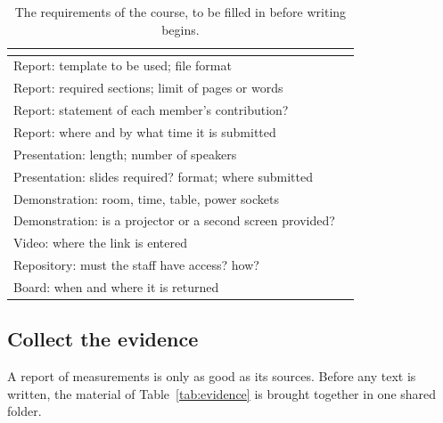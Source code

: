 \begin{table}[H]
\centering
\begin{tabular}{L{6.0cm}L{5.2cm}}
\toprule
{} &  \\
\midrule
Report: template to be used; file format & \\
Report: required sections; limit of pages or words & \\
Report: statement of each member's contribution? & \\
Report: where and by what time it is submitted & \\
Presentation: length; number of speakers & \\
Presentation: slides required? format; where submitted & \\
Demonstration: room, time, table, power sockets & \\
Demonstration: is a projector or a second screen provided? & \\
Video: where the link is entered & \\
Repository: must the staff have access? how? & \\
Board: when and where it is returned & \\
\bottomrule
\end{tabular}
\caption{The requirements of the course, to be filled in before writing begins.}
\label{tab:reqs}
\end{table}

\subsection{Collect the evidence}

A report of measurements is only as good as its sources. Before any text is written, the
material of Table~\ref{tab:evidence} is brought together in one shared folder.


